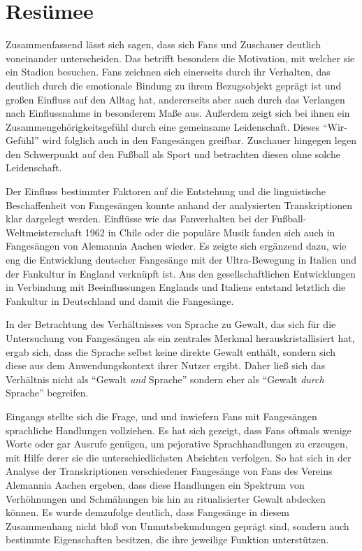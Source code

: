 \section{Resümee}
Zusammenfassend lässt sich sagen, dass sich Fans und Zuschauer deutlich voneinander unterscheiden.
Das betrifft besonders die Motivation, mit welcher sie ein Stadion besuchen.
Fans zeichnen sich einerseits durch ihr Verhalten, das deutlich durch die emotionale Bindung zu ihrem Bezugsobjekt geprägt ist und großen Einfluss auf den Alltag hat, andererseits aber auch durch das Verlangen nach Einflussnahme in besonderem Maße aus.
Außerdem zeigt sich bei ihnen ein Zusammengehörigkeitsgefühl durch eine gemeinsame Leidenschaft.
Dieses "`Wir-Gefühl"' wird folglich auch in den Fangesängen greifbar.
Zuschauer hingegen legen den Schwerpunkt auf den Fußball als Sport und betrachten diesen ohne solche Leidenschaft.

Der Einfluss bestimmter Faktoren auf die Entstehung und die linguistische Beschaffenheit von Fangesängen konnte anhand der analysierten Transkriptionen klar dargelegt werden.
Einflüsse wie das Fanverhalten bei der Fußball-Welt\-meis\-ter\-schaft 1962 in Chile oder die populäre Musik fanden sich auch in Fangesängen von Alemannia Aachen wieder.
Es zeigte sich ergänzend dazu, wie eng die Entwicklung deutscher Fangesänge mit der Ultra-Bewegung in Italien und der Fankultur in England verknüpft ist.
Aus den gesellschaftlichen Entwicklungen in Verbindung mit Beeinflussungen Englands und Italiens entstand letztlich die Fankultur in Deutschland und damit die Fangesänge.

In der Betrachtung des Verhältnisses von Sprache zu Gewalt, das sich für die Untersuchung von Fangesängen als ein zentrales Merkmal herauskristallisiert hat, ergab sich, dass die Sprache selbst keine direkte Gewalt enthält, sondern sich diese aus dem Anwendungskontext ihrer Nutzer ergibt.
Daher ließ sich das Verhältnis nicht als "`Gewalt \emph{und} Sprache"' sondern eher als "`Gewalt \emph{durch} Sprache"' begreifen.

Eingangs stellte sich die Frage, und und inwiefern Fans mit Fangesängen sprachliche Handlungen vollziehen.
Es hat sich gezeigt, dass Fans oftmals wenige Worte oder gar Ausrufe genügen, um pejorative Sprachhandlungen zu erzeugen, mit Hilfe derer sie die unterschiedlichsten Absichten verfolgen.
So hat sich in der Analyse der Transkriptionen verschiedener Fangesänge von Fans des Vereins Alemannia Aachen ergeben, dass diese Handlungen ein Spektrum von Verhöhnungen und Schmähungen bis hin zu ritualisierter Gewalt abdecken können.
Es wurde demzufolge deutlich, dass Fangesänge in diesem Zusammenhang nicht bloß von Unmutsbekundungen geprägt sind, sondern auch bestimmte Eigenschaften besitzen, die ihre jeweilige Funktion unterstützen.

